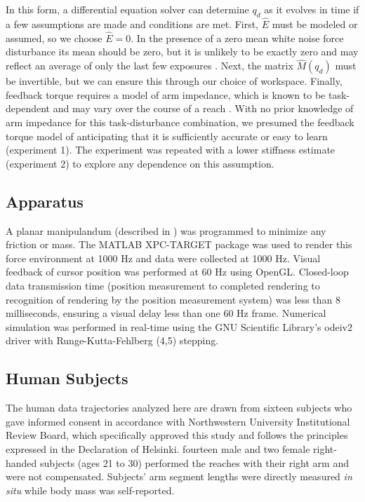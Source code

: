 \documentclass{frontiersSCNS} %
\begin{document}
\begin{methods}
In this form, a differential equation solver can determine $q_d$ as it evolves in time if a few assumptions are made and conditions are met. First, $\hat{E}$ must be modeled or assumed, so we choose $\hat{E}=0$. In the presence of a zero mean white noise force disturbance its mean should be zero, but it is unlikely to be exactly zero and may reflect an average of only the last few exposures \citep{scheidt2001learning}. Next, the matrix $\hat{M}(q_d)$ must be invertible, but we can ensure this through our choice of workspace. Finally, feedback torque requires a model of arm impedance, which is known to be task-dependent \citep{gomi1998task} and may vary over the course of a reach \citep{niu2010temporal}. With no prior knowledge of arm impedance for this task-disturbance combination, we presumed the feedback torque model of \cite{shadmehr1994adaptive} anticipating that it is sufficiently accurate or easy to learn (experiment 1). The experiment was repeated with a lower stiffness estimate (experiment 2) to explore any dependence on this assumption.

\subsection{Apparatus}
A planar manipulandum (described in \cite{patton2004robot}) was programmed to minimize any friction or mass. The MATLAB XPC-TARGET package \citep{MATLAB:2008} was used to render this force environment at 1000 Hz and data were collected at 1000 Hz.  Visual feedback of cursor position was performed at 60 Hz using OpenGL. Closed-loop data transmission time (position measurement to completed rendering to recognition of rendering by the position measurement system) was less than 8 milliseconds, ensuring a visual delay less than one 60 Hz frame. Numerical simulation was performed in real-time using the GNU Scientific Library's odeiv2 driver with Runge-Kutta-Fehlberg (4,5) stepping\citep{gough2009gnu}.

\subsection{Human Subjects}
The human data trajectories analyzed here are drawn from sixteen subjects who gave informed consent in accordance with Northwestern University Institutional Review Board, which specifically approved this study and follows the principles expressed in the Declaration of Helsinki. fourteen male and two female right-handed subjects (ages 21 to 30) performed the reaches with their right arm and were not compensated. Subjects' arm segment lengths were directly measured \textit{in situ} while body mass was self-reported.


\end{methods}
\end{document}
